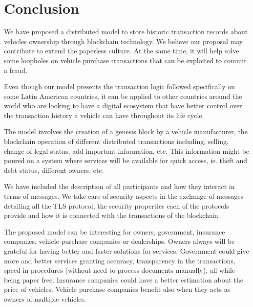 \section{Conclusion}
We have proposed a distributed model to store historic transaction 
records about vehicles ownership through blockchain technology.
We believe our proposal may contribute to extend the paperless culture.
At the same time, it will help solve some loopholes on vehicle purchase transactions
that can be exploited to commit a fraud. 

Even though our model presents the transaction logic 
followed specifically on some Latin American countries, 
it can be applied to other countries around the world 
who are looking to have a digital ecosystem 
that have better control over the transaction history a vehicle can have 
throughout its life cycle.

The model involves the creation of a genesis block by a vehicle manufacturer,
the blockchain operation of different distributed transactions including, selling,
change of legal status, add important information, etc. 
This information might be poured on a system 
where services will be available for quick access, ie. theft and debt status, 
different owners, etc.

We have included the description of all participants and how they interact in terms of 
messages. 
We take care of security aspects in the exchange of messages 
detailing all the TLS protocol, the security properties each of the protocols provide and how it is connected with the transactions of the blockchain.

The proposed model can be interesting for owners, government, insurance companies, 
vehicle purchase companies or dealerships. 
Owners always will be grateful for having better and faster solutions for services. 
Government could give more and better services granting accuracy, transparency in the transactions, 
speed in procedures (without need to process documents manually), all while being paper free. 
Insurance companies could have a better estimation about the price of vehicles. 
Vehicle purchase companies benefit also when they acts as owners of multiple vehicles.

